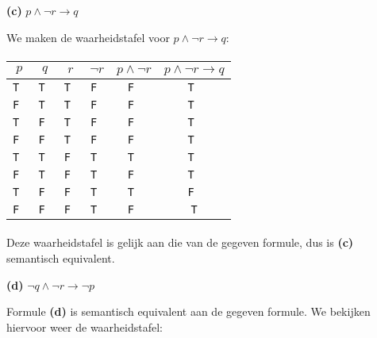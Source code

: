 \documentclass[a4paper,11pt]{article}
\begin{document}
\begin{description}
\item{\bf (c)} $p \wedge \neg r \rightarrow q$

We maken de waarheidstafel voor $p \wedge \neg r \rightarrow q$:

\paragraph{}

\begin{tabular}{c|c|c|c|c|c}
$p$   & $q$   & $r$   & $\neg r$ & $p \wedge \neg r$ & $p \wedge \neg r \rightarrow q$\\
\hline
\tt T & \tt T & \tt T & \tt F    & \tt F             & \tt T \\
\tt F & \tt T & \tt T & \tt F    & \tt F             & \tt T \\
\tt T & \tt F & \tt T & \tt F    & \tt F             & \tt T \\
\tt F & \tt F & \tt T & \tt F    & \tt F             & \tt T \\
\tt T & \tt T & \tt F & \tt T    & \tt T             & \tt T \\
\tt F & \tt T & \tt F & \tt T    & \tt F             & \tt T \\
\tt T & \tt F & \tt F & \tt T    & \tt T             & \tt F \\
\tt F & \tt F & \tt F & \tt T    & \tt F             & \tt T
\end{tabular}

\paragraph{}

Deze waarheidstafel is gelijk aan die van de gegeven formule, dus is \textbf{(c)}
semantisch equivalent.

\item{\bf (d)} $\neg q \wedge \neg r \rightarrow \neg p$

Formule \textbf{(d)} is semantisch equivalent aan de gegeven formule. We bekijken hiervoor
weer de waarheidstafel:

\paragraph{}


\end{description}
\end{document}
